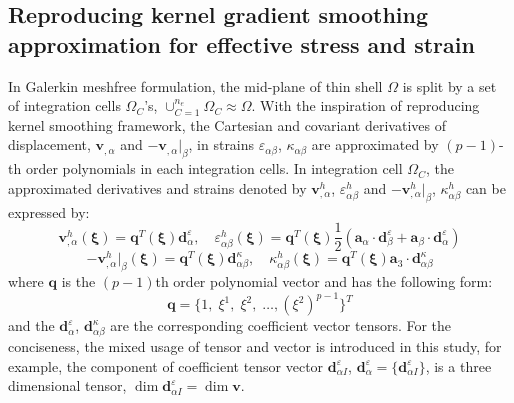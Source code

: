 \subsection{Reproducing kernel gradient smoothing approximation for effective stress and strain}
In Galerkin meshfree formulation, the mid-plane of thin shell $\Omega$ is split by a set of integration cells $\Omega_C$'s, $\cup_{C=1}^{n_e}\Omega_C\approx \Omega$. With the inspiration of reproducing kernel smoothing framework, the Cartesian and covariant derivatives of displacement, $\boldsymbol v_{,\alpha}$ and $-\boldsymbol v_{,\alpha}\vert_\beta$, in strains $\varepsilon_{\alpha\beta}$, $\kappa_{\alpha\beta}$ are approximated by $(p-1)$-th order polynomials in each integration cells. In integration cell $\Omega_C$, the approximated derivatives and strains denoted by $\boldsymbol v^h_{,\alpha}$, $\varepsilon^h_{\alpha\beta}$ and $-\boldsymbol v^h_{,\alpha}\vert_\beta$, $\kappa^h_{\alpha\beta}$ can be expressed by:
\begin{equation}\label{approxsn1}
    \boldsymbol v^h_{,\alpha}(\boldsymbol \xi) = \boldsymbol q^T(\boldsymbol \xi) \boldsymbol d_{\alpha}^\varepsilon, \quad
    \varepsilon^h_{\alpha\beta}(\boldsymbol \xi) = \boldsymbol q^T(\boldsymbol \xi) \frac{1}{2}(\boldsymbol a_\alpha \cdot \boldsymbol d_{\beta}^\varepsilon + \boldsymbol a_\beta \cdot \boldsymbol d_{\alpha}^\varepsilon)
\end{equation}
\begin{equation}\label{approxsn2}
    -\boldsymbol v^h_{,\alpha}\vert_\beta(\boldsymbol \xi) = \boldsymbol q^T(\boldsymbol \xi) \boldsymbol d_{\alpha\beta}^\kappa , \quad
    \kappa^h_{\alpha\beta}(\boldsymbol \xi) = \boldsymbol q^T(\boldsymbol \xi) \boldsymbol a_3 \cdot \boldsymbol d_{\alpha\beta}^\kappa
\end{equation}
where $\boldsymbol q$ is the $(p-1)$th order polynomial vector and has the following form:
\begin{equation}
\boldsymbol q = \{ 1,\; \xi^1,\; \xi^2,\; \dots, (\xi^2)^{p-1}\}^T
\end{equation}
and the $\boldsymbol d^\varepsilon_{\alpha}$, $\boldsymbol d^\kappa_{\alpha\beta}$ are the corresponding coefficient vector tensors. For the conciseness, the mixed usage of tensor and vector is introduced in this study, for example, the component of coefficient tensor vector $\boldsymbol d^\varepsilon_{\alpha I}$, $\boldsymbol d^\varepsilon_\alpha = \{\boldsymbol d^\varepsilon_{\alpha I}\}$, is a three dimensional tensor, $\dim \boldsymbol d^\varepsilon_{\alpha I} = \dim \boldsymbol v$.


